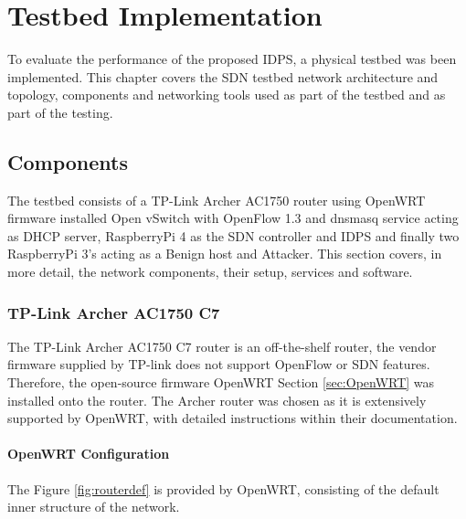 \documentclass[12pt, oneside]{book}
\begin{document}


\chapter{Testbed Implementation}
\label{Chap:testbed}
To evaluate the performance of the proposed IDPS, a physical testbed was been implemented. This chapter covers the SDN
testbed network architecture and topology, components and networking tools used as part of the testbed and as part 
of the testing.

\section{Components}
The testbed consists of a TP-Link Archer AC1750 router using OpenWRT firmware installed Open vSwitch with OpenFlow 1.3 and
dnsmasq service acting as DHCP server, RaspberryPi 4 as the SDN controller and IDPS and finally two RaspberryPi 3's
acting as a Benign host and Attacker. This section covers, in more detail, the network
components, their setup, services and software.

\subsection{TP-Link Archer AC1750 C7}
The TP-Link Archer AC1750 C7 router is an off-the-shelf router, the vendor firmware supplied by TP-link does 
not support OpenFlow or SDN features. Therefore, the open-source firmware OpenWRT
Section \ref{sec:OpenWRT} was installed onto the router. The Archer router was chosen as it is extensively supported by OpenWRT,
with detailed instructions within their documentation\cite{openwrtprojectRouter}.

\subsubsection{OpenWRT Configuration}
The Figure \ref{fig:routerdef} is provided by OpenWRT, consisting of the default inner structure
of the network.
\end{document}
